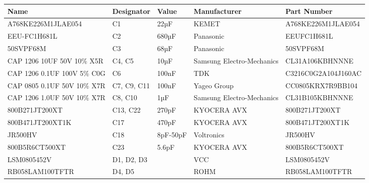 \documentclass{standalone}
\begin{document}
\centering

\begin{tabular}{lllll}

	\toprule
	\textbf{Name}                         & \textbf{Designator} & \textbf{Value}     & \textbf{Manufacturer}        & \textbf{Part Number} \\
	\midrule
	A768KE226M1JLAE054                    & C1                  & 22µF               & KEMET                        & A768KE226M1JLAE054   \\
	EEU-FC1H681L                          & C2                  & 680µF              & Panasonic                    & EEUFC1H681L          \\
	50SVPF68M                             & C3                  & 68µF               & Panasonic                    & 50SVPF68M            \\
	CAP 1206 10UF 50V 10\% X5R            & C4, C5              & 10µF               & Samsung Electro-Mechanics    & CL31A106KBHNNNE      \\
	CAP 1206 0.1UF 100V 5\% C0G           & C6                  & 100nF              & TDK                          & C3216C0G2A104J160AC  \\
	CAP 0805 0.1UF 50V 10\% X7R           & C7, C9, C11         & 100nF              & Yageo Group                  & CC0805KRX7R9BB104    \\
	CAP 1206 1.0UF 50V 10\% X7R           & C8, C10             & 1µF                & Samsung Electro-Mechanics    & CL31B105KBHNNNE      \\
	800B271JT200XT                        & C13, C22            & 270pF              & KYOCERA AVX                  & 800B271JT200XT       \\
	800B471JT200XT1K                      & C17                 & 470pF              & KYOCERA AVX                  & 800B471JT200XT1K     \\
	JR500HV                               & C18                 & 8pF-50pF           & Voltronics                   & JR500HV              \\
	800B5R6CT500XT                        & C23                 & 5.6pF              & KYOCERA AVX                  & 800B5R6CT500XT       \\
	LSM0805452V                           & D1, D2, D3          &                    & VCC                          & LSM0805452V          \\
	RB058LAM100TFTR                       & D4, D5              &                    & ROHM                         & RB058LAM100TFTR      \\

\end{tabular}
\end{document}
